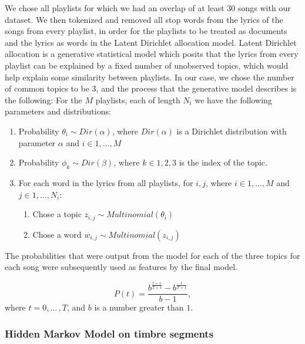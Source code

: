 \documentclass[acmtog]{acmart}
\begin{document}
We chose all playlists for which we had an overlap of at least 30 songs with our dataset. We then tokenized and removed all stop words from the lyrics of the songs from every playlist, in order for the playlists to be treated as documents and the lyrics as words in the Latent Dirichlet allocation model. Latent Dirichlet allocation is a generative statistical model which posits that the lyrics from every playlist can be explained by a fixed number of unobserved topics, which would help explain some similarity between playlists. In our case, we chose the number of common topics to be 3, and the process that the generative model describes is the following: \newline
For the $M$ playlists, each of length $N_{i}$ we have the following parameters and distributions:
\begin{enumerate}
  \item Probability $\theta_{i} \sim Dir(\alpha)$, where $Dir(\alpha)$ is a Dirichlet distribution with parameter $\alpha$ and $i \in {1, ..., M}$
  \item Probability $\phi_{k} \sim Dir(\beta)$, where $k \in {1,2,3}$ is the index of the topic.
  \item For each word in the lyrics from all playlists, for $i, j$, where $i \in {1, ..., M}$ and $j \in {1, ..., N_{i}}$:
     \begin{enumerate}
       \item Chose a topic $z_{i, j} \sim Multinomial(\theta_{i})$
       \item Chose a word $w_{i, j} \sim Multinomial(z_{i, j})$
     \end{enumerate}
\end{enumerate}

The probabilities that were output from the model for each of the three topics for each song were subsequently used as features by the final model.

\begin{equation}
\label{eqn:01}
P(t)=\frac{b^{\frac{t+1}{T+1}}-b^{\frac{t}{T+1}}}{b-1},
\end{equation}
where $t=0,{\ldots}\,,T$, and $b$ is a number greater than $1$.

\subsubsection{Hidden Markov Model on timbre segments}
\end{document}
